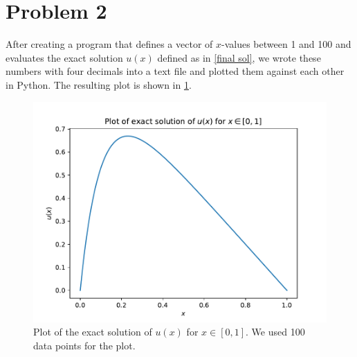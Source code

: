 \documentclass[english,notitlepage]{revtex4-1}  %
\begin{document}
\section*{Problem 2}
After creating a program that defines a vector of $x$-values between 1 and 100 and evaluates the exact solution $u(x)$ defined as in \cref{final sol}, we wrote these numbers with four decimals into a text file and plotted them against each other in Python. The resulting plot is shown in \cref{plot_problem2}.
\begin{figure}[h!]
    \centering 
    \includegraphics[scale=0.80]{../data/exactSolution.pdf} %
    \caption{Plot of the exact solution of $u(x)$ for $x ∈ [0,1]$. We used 100 data points for the plot.}
    \label{plot_problem2}
\end{figure}
\end{document}
